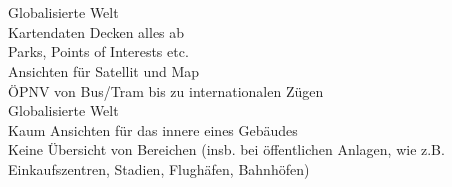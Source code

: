 \section{
}
Globalisierte Welt\\
Kartendaten Decken alles ab\\
Parks, Points of Interests etc.\\
Ansichten für Satellit und Map\\
ÖPNV von Bus/Tram bis zu internationalen Zügen\\
Globalisierte Welt\\
Kaum Ansichten für das innere eines Gebäudes\\
Keine Übersicht von Bereichen (insb. bei öffentlichen Anlagen, wie z.B. Einkaufszentren, Stadien, Flughäfen, Bahnhöfen)
